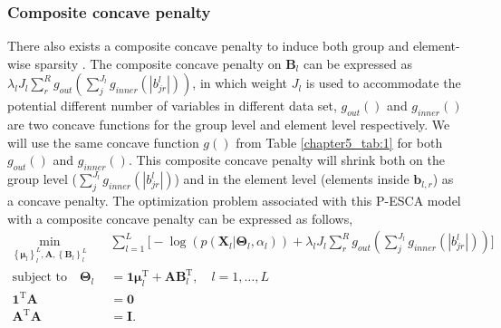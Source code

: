 \subsubsection{Composite concave penalty}
There also exists a composite concave penalty to induce both group and element-wise sparsity \cite{huang2012selective}. The composite concave penalty on $\mathbf{B}_l$ can be expressed as $\lambda_l J_l \sum_{r}^{R} g_{out}(\sum_{j}^{J_l} g_{inner}(|b_{jr}^l|))$, in which weight $J_l$ is used to accommodate the potential different number of variables in different data set, $g_{out}()$ and $g_{inner}()$ are two concave functions for the group level and element level respectively. We will use the same concave function $g()$ from Table \ref{chapter5_tab:1} for both $g_{out}()$ and $g_{inner}()$. This composite concave penalty will shrink both on the group level ($\sum_{j}^{J_l} g_{inner}(|b_{jr}^l|)$) and in the element level (elements inside $\mathbf{b}_{l,r}$) as a concave penalty. The optimization problem associated with this P-ESCA model with a composite concave penalty can be expressed as follows,
\begin{equation}\label{chapter6_eq:3}
\begin{aligned}
    \min_{ \left\{\bm{\mu}_l\right\}_{l}^{L}, \mathbf{A}, \left\{\mathbf{B}_l\right\}_{l}^{L}} \quad & \sum_{l=1}^{L} \Big[ -\log(p(\mathbf{X}_l|\mathbf{\Theta}_l, \alpha_l)) + \lambda_l J_l \sum_{r}^{R} g_{out}(\sum_{j}^{J_l} g_{inner}(|b_{jr}^l|)) \Big] \\
    \text{subject to} \quad \mathbf{\Theta}_l &= \mathbf{1}\bm{\mu}_l^{\text{T}} + \mathbf{AB}_l^{\text{T}}, \quad l = 1,\ldots,L \\
     \mathbf{1}^{\text{T}}\mathbf{A} &= \mathbf{0}\\
	 \mathbf{A}^{\text{T}}\mathbf{A} &= \mathbf{I}. \\
\end{aligned}
\end{equation}

